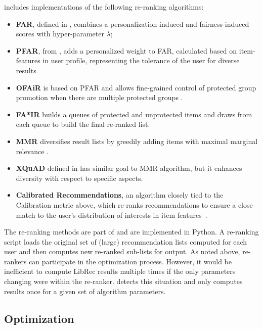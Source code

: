 \libauto{} includes implementations of the following re-ranking algorithms:
\begin{itemize}
    \item \textbf{FAR}, defined in \cite{liu2019farpfar}, combines a personalization-induced and fairness-induced scores with hyper-parameter $\lambda$;
    \item \textbf{PFAR}, from \cite{liu2019farpfar}, adds a personalized weight to FAR, calculated based on item-features in user profile, representing the tolerance of the user for diverse results
    \item \textbf{OFAiR} is based on PFAR and allows fine-grained control of protected group promotion when there are multiple protected groups \cite{sonboli2020opportunistic}.
    \item \textbf{FA*IR} \cite{zehlike2017fa} builds a queues of protected and unprotected items and draws from each queue to build the final re-ranked list.
    \item \textbf{MMR} diversifies result lists by greedily adding items with maximal marginal relevance \cite{carbonell1998use}.
    \item \textbf{XQuAD} defined in \cite{santos2010explicit} has similar goal to MMR algorithm, but it enhances diversity with respect to specific aspects.
    \item \textbf{Calibrated Recommendations}, an algorithm closely tied to the Calibration metric above, which re-ranks recommendations to ensure a close match to the user's distribution of interests in item features~\cite{steck2018calibrated}.
\end{itemize}

The re-ranking methods are part of \libauto{} and are implemented in Python. A re-ranking script loads the original set of (large) recommendation lists computed for each user and then computes new re-ranked sub-lists for output. As noted above, re-rankers can participate in the optimization process. However, it would be inefficient to compute LibRec results multiple times if the only parameters changing were within the re-ranker. \libauto{} detects this situation and only computes results once for a given set of algorithm parameters. 


\subsection{Optimization}
\label{subsec:libauto_opt}

